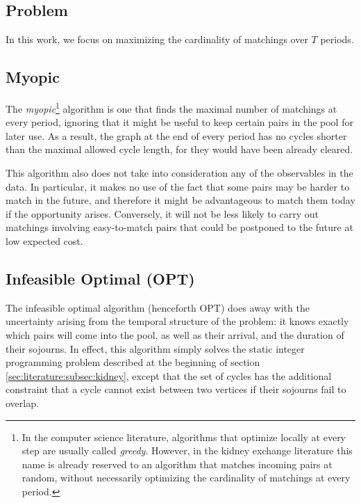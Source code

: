 \documentclass[12pt]{article}
\begin{document}
\subsection{Problem}

In this work, we focus on maximizing the cardinality of matchings over $T$ periods. 


\subsection{Myopic}

The \emph{myopic}\footnote{In the computer science literature, algorithms that optimize locally at every step are usually called \emph{greedy}. However, in the kidney exchange literature this name is already reserved to an algorithm that matches incoming pairs at random, without necessarily optimizing the cardinality of matchings at every period.} algorithm is one that finds the maximal number of matchings at every period, ignoring that it might be useful to keep certain pairs in the pool for later use. As a result, the graph at the end of every period has no cycles shorter than the maximal allowed cycle length, for they would have been already cleared.

This algorithm also does not take into consideration any of the observables in the data. In particular, it makes no use of the fact that some pairs may be harder to match in the future, and therefore it might be advantageous to match them today if the opportunity arises. Conversely, it will not be less likely to carry out matchings involving easy-to-match pairs that could be postponed to the future at low expected cost.


\subsection{Infeasible Optimal (OPT)}

The infeasible optimal algorithm (henceforth OPT) does away with the uncertainty arising from the temporal structure of the problem: it knows exactly which pairs will come into the pool, as well as their arrival, and the duration of their sojourns. In effect, this algorithm simply solves the static integer programming problem described at the beginning of section \ref{sec:literature:subsec:kidney}, except that the set of cycles has the additional constraint that a cycle cannot exist between two vertices if their sojourns fail to overlap.
\end{document}
